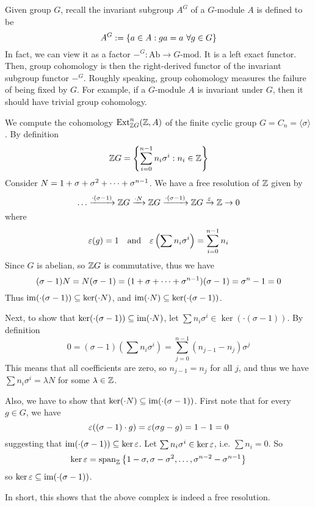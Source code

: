 \medskip

\begin{re}
    Given group $G$, recall the invariant subgroup $A^G$ of a $G$-module $A$ is defined to be
    \[A^G:= \sbr{a\in A: ga = a\ \forall g\in G}\]
    In fact, we can view it as a factor $-^G: \text{Ab} \to G\text{-mod}$. It is a left exact functor. Then, group cohomology is then the right-derived functor of the invariant subgroup functor $-^G$. Roughly speaking, group cohomology measures the failure of being fixed by $G$. For example, if a $G$-module $A$ is invariant under $G$, then it should have trivial group cohomology. 
\end{re}

\medskip

\begin{ex}
    We compute the cohomology $\operatorname{Ext}_{{\mathbb Z} G}^n ({\mathbb Z}, A)$ of the finite cyclic group $G=C_n = \langle \sigma \rangle$. By definition
    \[{\mathbb Z} G = \left\{\sum_{i=0}^{n-1} n_i \sigma^i:n_i\in {\mathbb Z}\right\} \]
    Consider $N= 1 + \sigma + \sigma^2 +\dots+ \sigma^{n-1}$. We have a free resolution of ${\mathbb Z}$ given by 
    \[\dots \xrightarrow{\cdot (\sigma-1)} {\mathbb Z} G \xrightarrow{\cdot N} {\mathbb Z} G \xrightarrow{\cdot (\sigma-1)} {\mathbb Z} G \xrightarrow{\varepsilon} {\mathbb Z} \to 0\]
    where 
    \[\varepsilon(g)=1 \quad \text{and} \quad \varepsilon\left(\sum n_i \sigma^i\right) = \sum_{i=0}^{n-1} n_i\]
    Since $G$ is abelian, so ${\mathbb Z} G$ is commutative, thus we have
    \[(\sigma-1)N = N(\sigma-1) = (1+\sigma +\dots+ \sigma^{n-1})(\sigma-1) = \sigma^n-1=0\]
    Thus $\operatorname{im} (\cdot (\sigma-1))\subseteq \ker (\cdot N)$, and $\operatorname{im} (\cdot N) \subseteq \ker(\cdot (\sigma-1))$.

    Next, to show that $\ker (\cdot (\sigma-1))\subseteq \operatorname{im} (\cdot N)$, let $\sum n_i \sigma^i\in \ker (\cdot (\sigma-1))$. By definition
    \[0=(\sigma-1)(\sum n_i \sigma^i) = \sum_{j=0}^{n-1} (n_{j-1} - n_j) \sigma^j\]
    This means that all coefficients are zero, so $n_{j-1} = n_j$ for all $j$, and thus we have $\sum n_i \sigma^i = \lambda N$ for some $\lambda\in {\mathbb Z}$.

    Also, we have to show that $\ker (\cdot N) \subseteq \operatorname{im} (\cdot (\sigma-1))$. First note that for every $g\in G$, we have 
    \[\varepsilon((\sigma-1)\cdot g) = \varepsilon (\sigma g - g) = 1-1 = 0\]
    suggesting that $\operatorname{im}(\cdot (\sigma-1))\subseteq\ker \varepsilon$. Let $\sum n_i \sigma^i \in \ker \varepsilon$, i.e. $\sum n_i = 0$. So
    \[\ker \varepsilon = \operatorname{span} _{\mathbb Z} \left\{1-\sigma, \sigma-\sigma^2 ,\dots, \sigma^{n-2} - \sigma^{n-1}\right\}\]
    so $\ker \varepsilon \subseteq \operatorname{im} (\cdot (\sigma-1))$.

    In short, this shows that the above complex is indeed a free resolution. 


\end{ex}
